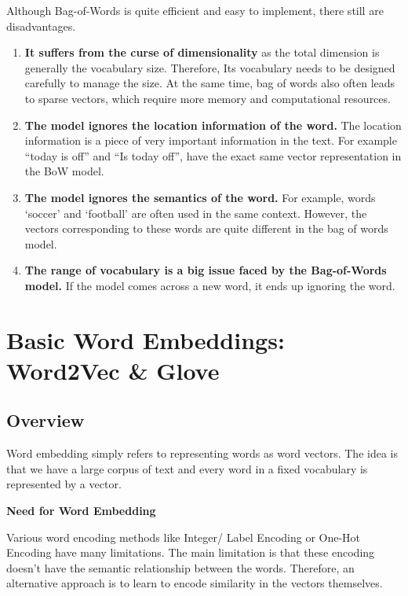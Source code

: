 \documentclass[
]{book}
\begin{document}
Although Bag-of-Words is quite efficient and easy to implement, there still are disadvantages.

\begin{enumerate}
\def\labelenumi{\arabic{enumi}.}
\item
  \textbf{It suffers from the curse of dimensionality} as the total dimension is generally the vocabulary size. Therefore, Its vocabulary needs to be designed carefully to manage the size. At the same time, bag of words also often leads to sparse vectors, which require more memory and computational resources.
\item
  \textbf{The model ignores the location information of the word.} The location information is a piece of very important information in the text. For example ``today is off'' and ``Is today off'', have the exact same vector representation in the BoW model.
\item
  \textbf{The model ignores the semantics of the word.} For example, words `soccer' and `football' are often used in the same context. However, the vectors corresponding to these words are quite different in the bag of words model.
\item
  \textbf{The range of vocabulary is a big issue faced by the Bag-of-Words model.} If the model comes across a new word, it ends up ignoring the word.
\end{enumerate}

\hypertarget{basic-word-embeddings-word2vec-glove}{%
\chapter{Basic Word Embeddings: Word2Vec \& Glove}\label{basic-word-embeddings-word2vec-glove}}

\hypertarget{overview}{%
\section{Overview}\label{overview}}

Word embedding simply refers to representing words as word vectors. The idea is that we have a large corpus of text and every word in a fixed vocabulary is represented by a vector.

\textbf{Need for Word Embedding}

Various word encoding methods like Integer/ Label Encoding or One-Hot Encoding have many limitations. The main limitation is that these encoding doesn't have the semantic relationship between the words. Therefore, an alternative approach is to learn to encode similarity in the vectors themselves.
\end{document}
